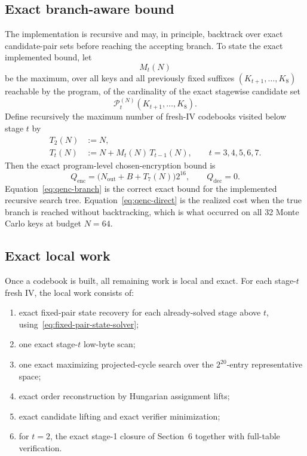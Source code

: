 \documentclass[11pt]{article}
\begin{document}
\subsection{Exact branch-aware bound}
The implementation is recursive and may, in principle, backtrack over exact candidate-pair sets before reaching the accepting branch. To state the exact implemented bound, let
\[
M_t(N)
\]
be the maximum, over all keys and all previously fixed suffixes $(K_{t+1},\dots,K_8)$ reachable by the program, of the cardinality of the exact stagewise candidate set
\[
\mathcal{P}_t^{(N)}(K_{t+1},\dots,K_8).
\]
Define recursively the maximum number of fresh-IV codebooks visited below stage $t$ by
\begin{align}
T_2(N) &:= N, \label{eq:T2}\\
T_t(N) &:= N + M_t(N)\,T_{t-1}(N), \qquad t=3,4,5,6,7. \label{eq:Trec}
\end{align}
Then the exact program-level chosen-encryption bound is
\begin{equation}
\label{eq:qenc-branch}
Q_{\mathrm{enc}}
=
\bigl(N_{\mathrm{out}}+B+T_7(N)\bigr)2^{16},
\qquad
Q_{\mathrm{dec}}=0.
\end{equation}
Equation~\eqref{eq:qenc-branch} is the correct exact bound for the implemented recursive search tree. Equation~\eqref{eq:qenc-direct} is the realized cost when the true branch is reached without backtracking, which is what occurred on all 32 Monte Carlo keys at budget $N=64$.

\subsection{Exact local work}
Once a codebook is built, all remaining work is local and exact. For each stage-$t$ fresh IV, the local work consists of:
\begin{enumerate}[label=\arabic*.,leftmargin=1.5em]
\item exact fixed-pair state recovery for each already-solved stage above $t$, using~\eqref{eq:fixed-pair-state-solver};
\item one exact stage-$t$ low-byte scan;
\item one exact maximizing projected-cycle search over the $2^{20}$-entry representative space;
\item exact order reconstruction by Hungarian assignment lifts;
\item exact candidate lifting and exact verifier minimization;
\item for $t=2$, the exact stage-1 closure of Section~6 together with full-table verification.
\end{enumerate}
\end{document}
